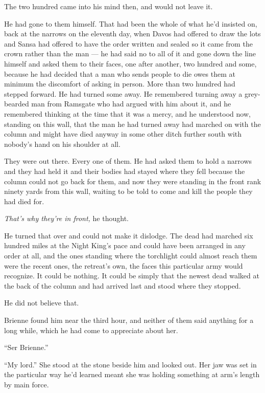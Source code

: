 The two hundred came into his mind then, and would not leave it.

He had gone to them himself. That had been the whole of what he’d insisted on, back at the narrows on the eleventh day, when Davos had offered to draw the lots and Sansa had offered to have the order written and sealed so it came from the crown rather than the man — he had said no to all of it and gone down the line himself and asked them to their faces, one after another, two hundred and some, because he had decided that a man who sends people to die owes them at minimum the discomfort of asking in person. More than two hundred had stepped forward. He had turned some away. He remembered turning away a grey-bearded man from Ramsgate who had argued with him about it, and he remembered thinking at the time that it was a mercy, and he understood now, standing on this wall, that the man he had turned away had marched on with the column and might have died anyway in some other ditch further south with nobody’s hand on his shoulder at all.

They were out there. Every one of them. He had asked them to hold a narrows and they had held it and their bodies had stayed where they fell because the column could not go back for them, and now they were standing in the front rank ninety yards from this wall, waiting to be told to come and kill the people they had died for.

\textit{That’s why they’re in front,} he thought.

He turned that over and could not make it dislodge. The dead had marched six hundred miles at the Night King’s pace and could have been arranged in any order at all, and the ones standing where the torchlight could almost reach them were the recent ones, the retreat’s own, the faces this particular army would recognize. It could be nothing. It could be simply that the newest dead walked at the back of the column and had arrived last and stood where they stopped.

He did not believe that.

\sceneBreak

Brienne found him near the third hour, and neither of them said anything for a long while, which he had come to appreciate about her.

“Ser Brienne.”

“My lord.” She stood at the stone beside him and looked out. Her jaw was set in the particular way he’d learned meant she was holding something at arm’s length by main force.

